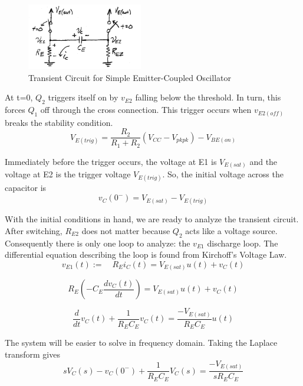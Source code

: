 \documentclass[titlepage, letterpaper, 10.5pt]{article}
\begin{document}
\begin{figure}[ht]
	\centering
	\includegraphics[width=0.45\textwidth]{diagrams/simple-transient-circuit}
	\caption{Transient Circuit for Simple Emitter-Coupled Oscillator}
	\label{simple-transient-circuit}
\end{figure}

At t=0, $Q_{2}$ triggers itself on by $v_{E2}$ falling below the threshold.
In turn, this forces $Q_{1}$ off through the cross connection.
This trigger occurs when $v_{E2(off)}$ breaks the stability condition.
\begin{equation}
V_{E(trig)}=\frac{R_{2}}{R_{1}+R_{2}}(V_{CC}-V_{pkpk})-V_{BE(on)}
\label{ve-trig-eq}
\end{equation}

Immediately before the trigger occurs, the voltage at E1 is $V_{E(sat)}$ and
the voltage at E2 is the trigger voltage $V_{E(trig)}$.
So, the initial voltage across the capacitor is
\begin{equation}
v_{C}(0^{-})=V_{E(sat)}-V_{E(trig)}
\end{equation}

With the initial conditions in hand, we are ready to analyze the transient circuit.
After switching, $R_{E2}$ does not matter because $Q_{2}$ acts like a voltage source.
Consequently there is only one loop to analyze: the $v_{E1}$ discharge loop.
The differential equation describing the loop is found from Kirchoff's Voltage Law.
\begin{equation}
v_{E1}(t):=\quad R_{E}i_{C}(t)=V_{E(sat)}u(t)+v_{C}(t)
\label{ve1-kvl}
\end{equation}

\begin{equation*}
R_{E}\left(-C_{E}\frac{dv_{C}(t)}{dt}\right)=V_{E(sat)}u(t)+v_{C}(t)
\end{equation*}

\begin{equation}
\frac{d}{dt}v_{C}(t)+\frac{1}{R_{E}C_{E}}v_{C}(t)=\frac{-V_{E(sat)}}{R_{E}C_{E}}u(t)
\end{equation}

The system will be easier to solve in frequency domain. Taking the Laplace transform gives
\begin{equation*}
sV_{C}(s)-v_{C}(0^{-})+\frac{1}{R_{E}C_{E}}V_{C}(s)=\frac{-V_{E(sat)}}{sR_{E}C_{E}}
\end{equation*}
\end{document}
